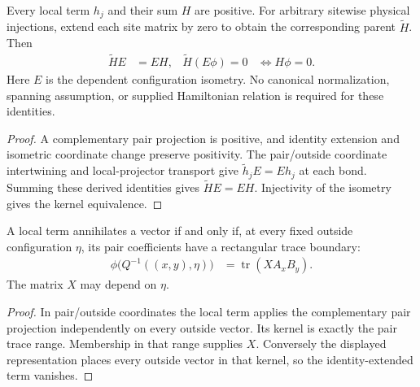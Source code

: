 \begin{lemma}
    \label{lem:varying_physical_parent_embedding_transport}
    \leanok
    Every local term $h_j$ and their sum $H$ are positive. For
    arbitrary sitewise physical injections, extend each site matrix by
    zero to obtain the corresponding parent $\widetilde H$. Then
    \begin{align}
        \widetilde H E & =EH,
                       & \widetilde H(E\phi)=0 & \iff H\phi=0.
    \end{align}
    Here $E$ is the dependent configuration isometry. No canonical
    normalization, spanning assumption, or supplied Hamiltonian relation
    is required for these identities.
\end{lemma}
\begin{proof}\leanok
    A complementary pair projection is positive, and identity extension
    and isometric coordinate change preserve positivity. The pair/outside
    coordinate intertwining and local-projector transport give
    $\widetilde h_j E=E h_j$ at each bond. Summing these derived identities
    gives $\widetilde H E=EH$. Injectivity of the isometry gives the kernel
    equivalence.
\end{proof}

\begin{lemma}
    \label{lem:varying_physical_local_boundary_sections}
    \leanok
    A local term annihilates a vector if and only if, at every
    fixed outside configuration $\eta$, its pair coefficients have a
    rectangular trace boundary:
    \begin{align}
        \phi\bigl(Q^{-1}((x,y),\eta)\bigr) & =\operatorname{tr}(XA_xB_y).
    \end{align}
    The matrix $X$ may depend on $\eta$.
\end{lemma}
\begin{proof}\leanok
    In pair/outside coordinates the local term applies the complementary
    pair projection independently on every outside vector. Its kernel is
    exactly the pair trace range. Membership in that range supplies
    $X$. Conversely the displayed representation places every outside
    vector in that kernel, so the identity-extended term vanishes.
\end{proof}

